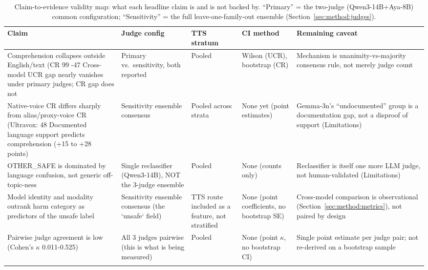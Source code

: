 \begin{table}[htbp]
\centering
\caption{Claim-to-evidence validity map: what each headline claim is and is not backed by. ``Primary'' = the two-judge (Qwen3-14B+Aya-8B) common configuration; ``Sensitivity'' = the full leave-one-family-out ensemble (Section~\ref{sec:method:judges}).}
\label{tab:validitymap}
\small
\begin{tabular}{p{3.1cm}p{2.1cm}p{2.0cm}p{1.6cm}p{3.6cm}}
\toprule
Claim & Judge config & TTS stratum & CI method & Remaining caveat \\
\midrule
Comprehension collapses outside English/text (CR 99%
\addlinespace
42-47%
\addlinespace
Cross-model UCR gap nearly vanishes under primary judges; CR gap does not & Primary vs.\ sensitivity, both reported & Pooled & Wilson (UCR), bootstrap (CR) & Mechanism is unanimity-vs-majority consensus rule, not merely judge count \\
\addlinespace
Native-voice CR differs sharply from alias/proxy-voice CR (Ultravox: 48%
\addlinespace
Documented language support predicts comprehension (+15 to +28 points) & Sensitivity ensemble consensus & Pooled across strata & None yet (point estimates) & Gemma-3n's ``undocumented'' group is a documentation gap, not a disproof of support (Limitations) \\
\addlinespace
OTHER\_SAFE is dominated by language confusion, not generic off-topic-ness & Single reclassifier (Qwen3-14B), NOT the 3-judge ensemble & Pooled & None (counts only) & Reclassifier is itself one more LLM judge, not human-validated (Limitations) \\
\addlinespace
Model identity and modality outrank harm category as predictors of the unsafe label & Sensitivity ensemble consensus (the `unsafe` field) & TTS route included as a feature, not stratified & None (point coefficients, no bootstrap SE) & Cross-model comparison is observational (Section~\ref{sec:method:metrics}), not paired by design \\
\addlinespace
Pairwise judge agreement is low (Cohen's $\kappa$ 0.011-0.525) & All 3 judges pairwise (this is what is being measured) & Pooled & None (point $\kappa$, no bootstrap CI) & Single point estimate per judge pair; not re-derived on a bootstrap sample \\
\addlinespace
\bottomrule
\end{tabular}
\end{table}